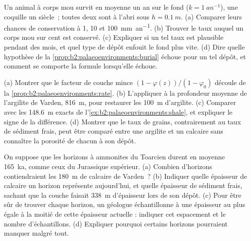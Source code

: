 \begin{exercise}[$\star\star\star$]\label{exo:b2:palaeoenvironments:10}
Un animal à corps mou survit en moyenne un an sur le fond ($k = \qty{1}{an^{-1}}$), une coquille
un siècle~; toutes deux sont à l'abri sous $h = \qty{0.1}{m}$. (a) Comparer leurs chances
de conservation à 1, 10 et \qty{100}{mm.an^{-1}}. (b) Trouver le taux auquel un corps mou sur
cent est conservé. (c) Expliquer si un tel taux est plausible pendant des mois, et quel type
de dépôt enfouit le fond plus vite. (d) Dire quelle hypothèse de la \cref{prop:b2:palaeoenvironments:burial}
échoue pour un tel dépôt, et comment se comporte la formule lorsqu'elle échoue.
\end{exercise}

\begin{exercise}[$\star\star\star$]\label{exo:b2:palaeoenvironments:11}
(a) Montrer que le facteur de couche mince $(1 - \varphi(z))/(1 - \varphi_0)$ découle de la
\cref{prop:b2:palaeoenvironments:rate}. (b) L'appliquer à la profondeur moyenne de l'argilite
de Varden, \qty{816}{m}, pour restaurer les \qty{100}{m} d'argilite. (c) Comparer avec les
\qty{148.6}{m} exacts de l'\cref{ex:b2:palaeoenvironments:shale}, et expliquer le signe de la
différence. (d) Montrer que le taux de grains, contrairement au taux de sédiment frais, peut
être comparé entre une argilite et un calcaire sans connaître la porosité de chacun à son dépôt.
\end{exercise}

\begin{exercise}[$\star\star\star$]\label{exo:b2:palaeoenvironments:12}
On suppose que les horizons à ammonites du Toarcien durent en moyenne \qty{165}{ka}, comme ceux du Jurassique
supérieur. (a) Combien d'horizons contiendraient les \qty{180}{m} de calcaire de Varden~? (b) Indiquer quelle
épaisseur de calcaire un horizon représente aujourd'hui, et quelle épaisseur de sédiment frais, sachant que
la couche faisait \qty{338}{m} d'épaisseur lors de son dépôt. (c) Pour être sûr de trouver chaque horizon, un
géologue échantillonne à une épaisseur au plus égale à la moitié de cette épaisseur actuelle : indiquer cet
espacement et le nombre d'échantillons. (d) Expliquer pourquoi certains horizons pourraient manquer malgré tout.
\end{exercise}

